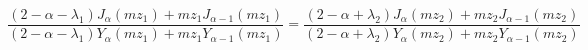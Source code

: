 \begin{equation}
\frac {(2-\alpha-\lambda_1)J_\alpha(mz_1)+ mz_1 J_{\alpha -
1}(mz_1)} {(2-\alpha-\lambda_1)Y_\alpha(mz_1)+ mz_1 Y_{\alpha -
1}(mz_1)}=\frac {(2-\alpha+\lambda_2)J_\alpha(mz_2)+ mz_2
J_{\alpha - 1}(mz_2)} {(2-\alpha+\lambda_2)Y_\alpha(mz_2)+ mz_2
Y_{\alpha - 1}(mz_2)} \label{kkmasses}
\end{equation}

